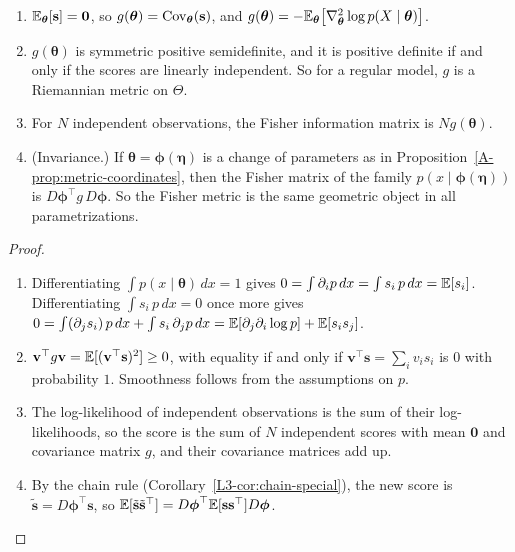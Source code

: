 \begin{proposition}\label{A-prop:fisher}
    \begin{enumerate}
        \item $\mathbb{E}_{\boldsymbol{\theta}}[\mathbf{s}] = \mathbf{0}$, so $g(\boldsymbol{\theta}) = \operatorname{Cov}_{\boldsymbol{\theta}}(\mathbf{s})$, and $g(\boldsymbol{\theta}) = -\mathbb{E}_{\boldsymbol{\theta}}\big[\nabla^2_{\boldsymbol{\theta}}\log p(X \mid \boldsymbol{\theta})\big]$.
        \item $g(\boldsymbol{\theta})$ is symmetric positive semidefinite, and it is positive definite if and only if the scores are linearly independent. So for a regular model, $g$ is a Riemannian metric on $\Theta$.
        \item For $N$ independent observations, the Fisher information matrix is $Ng(\boldsymbol{\theta})$.
        \item (Invariance.) If $\boldsymbol{\theta} = \boldsymbol{\phi}(\boldsymbol{\eta})$ is a change of parameters as in Proposition~\ref{A-prop:metric-coordinates}, then the Fisher matrix of the family $p(x \mid \boldsymbol{\phi}(\boldsymbol{\eta}))$ is $D\boldsymbol{\phi}^\top g\,D\boldsymbol{\phi}$. So the Fisher metric is the same geometric object in all parametrizations.
    \end{enumerate}
\end{proposition}

\begin{proof}
    \begin{enumerate}
        \item Differentiating $\int p(x \mid \boldsymbol{\theta})\, dx = 1$ gives $0 = \int \partial_ip\, dx = \int s_i\,p\, dx = \mathbb{E}[s_i]$. Differentiating $\int s_i\,p\, dx = 0$ once more gives $0 = \int (\partial_js_i)\,p\, dx + \int s_i\,\partial_jp\, dx = \mathbb{E}[\partial_j\partial_i\log p] + \mathbb{E}[s_is_j]$.
        \item $\mathbf{v}^\top g\mathbf{v} = \mathbb{E}[(\mathbf{v}^\top\mathbf{s})^2] \geq 0$, with equality if and only if $\mathbf{v}^\top\mathbf{s} = \sum_i v_is_i$ is $0$ with probability $1$. Smoothness follows from the assumptions on $p$.
        \item The log-likelihood of independent observations is the sum of their log-likelihoods, so the score is the sum of $N$ independent scores with mean $\mathbf{0}$ and covariance matrix $g$, and their covariance matrices add up.
        \item By the chain rule (Corollary~\ref{L3-cor:chain-special}), the new score is $\tilde{\mathbf{s}} = D\boldsymbol{\phi}^\top\mathbf{s}$, so $\mathbb{E}[\tilde{\mathbf{s}}\tilde{\mathbf{s}}^\top] = D\boldsymbol{\phi}^\top\mathbb{E}[\mathbf{s}\mathbf{s}^\top]D\boldsymbol{\phi}$. \qedhere
    \end{enumerate}
\end{proof}

